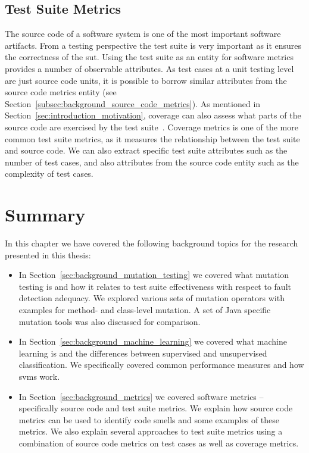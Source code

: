 \subsection{Test Suite Metrics}
\label{subsec:background_test_suite_metrics}
The source code of a software system is one of the most important software artifacts. From a testing perspective the test suite is very important as it ensures the correctness of the \gls{sut}. Using the test suite as an entity for software metrics provides a number of observable attributes. As test cases at a unit testing level are just source code units, it is possible to borrow similar attributes from the source code metrics entity (see Section~\ref{subsec:background_source_code_metrics}). As mentioned in Section~\ref{sec:introduction_motivation}, coverage can also assess what parts of the source code are exercised by the test suite~\cite{ZHM97}. Coverage metrics is one of the more common test suite metrics, as it measures the relationship between the test suite and source code. We can also extract specific test suite attributes such as the number of test cases, and also attributes from the source code entity such as the complexity of test cases.


\section{Summary}
\label{sec:background_summary}
In this chapter we have covered the following background topics for the research presented in this thesis:

\begin{itemize}
  \item In Section~\ref{sec:background_mutation_testing} we covered what mutation testing is and how it relates to test suite effectiveness with respect to fault detection adequacy. We explored various sets of mutation operators with examples for method- and class-level mutation. A set of Java specific mutation tools was also discussed  for comparison.
  \item In Section~\ref{sec:background_machine_learning} we covered what machine learning is and the differences between supervised and unsupervised classification. We specifically covered common performance measures and how \gls{svm}s work.
  \item In Section~\ref{sec:background_metrics} we covered software metrics -- specifically source code and test suite metrics. We explain how source code metrics can be used to identify code smells and some examples of these metrics. We also explain several approaches to test suite metrics using a combination of source code metrics on test cases as well as coverage metrics.
\end{itemize}
